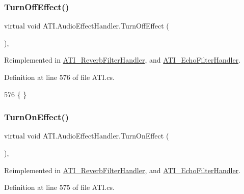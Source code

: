 \subsubsection{\texorpdfstring{Turn\+Off\+Effect()}{TurnOffEffect()}}
{\footnotesize\ttfamily virtual void A\+T\+I.\+Audio\+Effect\+Handler.\+Turn\+Off\+Effect (\begin{DoxyParamCaption}{ }\end{DoxyParamCaption})\hspace{0.3cm}{\ttfamily [protected]}, {\ttfamily [virtual]}}



Reimplemented in \hyperlink{class_a_t_i___reverb_filter_handler_a87b5c207c0ec0422ce8bea66a38334e2}{A\+T\+I\+\_\+\+Reverb\+Filter\+Handler}, and \hyperlink{class_a_t_i___echo_filter_handler_aefc1d2ab19273b9606c09eff2db13165}{A\+T\+I\+\_\+\+Echo\+Filter\+Handler}.



Definition at line 576 of file A\+T\+I.\+cs.


\begin{DoxyCode}
576 \{ \}
\end{DoxyCode}
\mbox{\label{class_a_t_i_1_1_audio_effect_handler_abccfc2e809d0d6b643704f7391461cd7}} 
\subsubsection{\texorpdfstring{Turn\+On\+Effect()}{TurnOnEffect()}}
{\footnotesize\ttfamily virtual void A\+T\+I.\+Audio\+Effect\+Handler.\+Turn\+On\+Effect (\begin{DoxyParamCaption}{ }\end{DoxyParamCaption})\hspace{0.3cm}{\ttfamily [protected]}, {\ttfamily [virtual]}}



Reimplemented in \hyperlink{class_a_t_i___reverb_filter_handler_aa25fcaa9c07d614b869334e1db14f7d6}{A\+T\+I\+\_\+\+Reverb\+Filter\+Handler}, and \hyperlink{class_a_t_i___echo_filter_handler_af759b786ad6e701f816264fefdddb078}{A\+T\+I\+\_\+\+Echo\+Filter\+Handler}.



Definition at line 575 of file A\+T\+I.\+cs.


